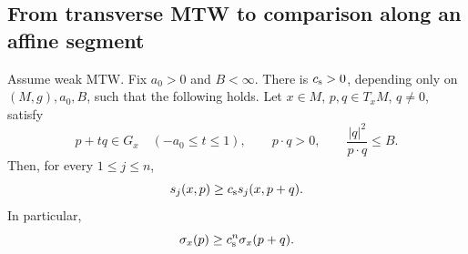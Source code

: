 \subsection{From transverse MTW to comparison along an affine segment}

\begin{lemma}
\label{spec:comparison}
Assume weak MTW.  Fix $a_0>0$ and $B<\infty$.  There is
$c_{\rm s}>0$, depending only on $(M,g),a_0,B$, such that the
following holds.  Let $x\in M$, $p,q\in T_xM$, $q\ne0$, satisfy
\begin{equation}\label{spec:segment-hypotheses}
  p+tq\in G_x\quad(-a_0\le t\le1),\qquad
  p\cdot q>0,\qquad
  \frac{|q|^2}{p\cdot q}\le B.
\end{equation}
Then, for every $1\le j\le n$,
\begin{equation}\label{spec:ordered-comparison}
  s_j(x,p)\ge c_{\rm s}s_j(x,p+q).
\end{equation}
In particular,
\begin{equation}\label{spec:product-comparison}
  \sigma_x(p)\ge c_{\rm s}^n\sigma_x(p+q).
\end{equation}
\end{lemma}

